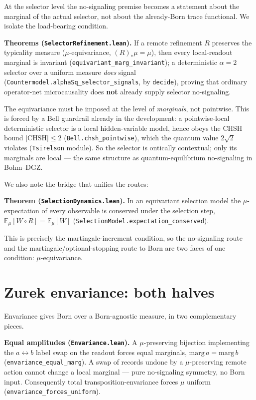 \documentclass[11pt,a4paper]{article}
\newenvironment{qiqtquote}{\begin{mdframed}[style=quotestyle]}{\end{mdframed}}
\begin{document}
At the selector level the no-signaling premise becomes a statement about the marginal of the actual
selector, not about the already-Born trace functional. We isolate the load-bearing condition.

\begin{qiqtquote}
\textbf{Theorems (\texttt{SelectorRefinement.lean}).} If a remote refinement $R$ preserves the typicality measure
($\mu$-equivariance, $(R)_*\mu=\mu$), then every local-readout marginal is invariant
(\texttt{equivariant\_marg\_invariant}); a deterministic $\alpha=2$ selector over a uniform measure \emph{does} signal
(\texttt{Countermodel.alphaSq\_selector\_signals}, by \texttt{decide}), proving that ordinary operator-net microcausality
does \textbf{not} already supply selector no-signaling.
\end{qiqtquote}

The equivariance must be imposed at the level of \emph{marginals}, not pointwise. This is forced by a Bell
guardrail already in the development: a pointwise-local deterministic selector is a local hidden-variable
model, hence obeys the CHSH bound $\lvert\mathrm{CHSH}\rvert\le 2$ (\texttt{Bell.chsh\_pointwise}), which the quantum
value $2\sqrt2$ violates (\texttt{Tsirelson} module). So the selector is ontically contextual; only its marginals
are local — the same structure as quantum-equilibrium no-signaling in Bohm–DGZ.

We also note the bridge that unifies the routes:

\begin{qiqtquote}
\textbf{Theorem (\texttt{SelectionDynamics.lean}).} In an equivariant selection model the $\mu$-expectation of every
observable is conserved under the selection step, $\mathbb{E}_\mu[W\circ R]=\mathbb{E}_\mu[W]$
(\texttt{SelectionModel.expectation\_conserved}).
\end{qiqtquote}

This is precisely the martingale-increment condition, so the no-signaling route and the
martingale/optional-stopping route to Born are two faces of one condition: $\mu$-equivariance.

\section{Zurek envariance: both halves}

Envariance gives Born over a Born-agnostic measure, in two complementary pieces.

\begin{qiqtquote}
\textbf{Equal amplitudes (\texttt{Envariance.lean}).} A $\mu$-preserving bijection implementing the $a\leftrightarrow b$ label swap on the readout forces equal marginals, $\mathrm{marg}\,a=\mathrm{marg}\,b$
(\texttt{envariance\_equal\_marg}). A swap of records undone by a $\mu$-preserving remote action cannot change a
local marginal — pure no-signaling symmetry, no Born input. Consequently total transposition-envariance
forces $\mu$ uniform (\texttt{envariance\_forces\_uniform}).
\end{qiqtquote}
\end{document}
